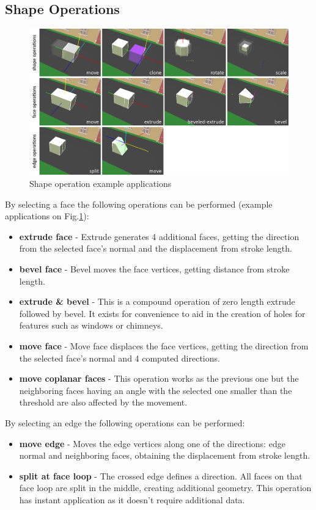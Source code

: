 \subsection{Shape Operations}

\begin{figure}[ht]
	\centering
		\includegraphics[width=\textwidth]{gfx/ops.png}
	\caption{Shape operation example applications}
	\label{fig:ops}
\end{figure}


By selecting a face the following operations can be performed (example applications on Fig.\ref{fig:ops}):
\begin{itemize}
	\item \textbf{extrude face} - Extrude generates 4 additional faces, getting the direction from the selected face's normal and the displacement from stroke length.
	\item	\textbf{bevel face} - Bevel moves the face vertices, getting distance from stroke length.
	\item	\textbf{extrude \& bevel} - This is a compound operation of zero length extrude followed by bevel. It exists for convenience to aid in the creation of holes for features such as windows or chimneys.
	\item	\textbf{move face} - Move face displaces the face vertices, getting the direction from the selected face's normal and 4 computed directions.
	\item	\textbf{move coplanar faces} - This operation works as the previous one but the neighboring faces having an angle with the selected one smaller than the threshold are also affected by the movement.
\end{itemize}

By selecting an edge the following operations can be performed:
\begin{itemize}
	\item \textbf{move edge} - Moves the edge vertices along one of the directions: edge normal and neighboring faces, obtaining the displacement from stroke length.
	\item	\textbf{split at face loop} - The crossed edge defines a direction. All faces on that face loop are split in the middle, creating additional geometry. This operation has instant application as it doesn't require additional data.
\end{itemize}

